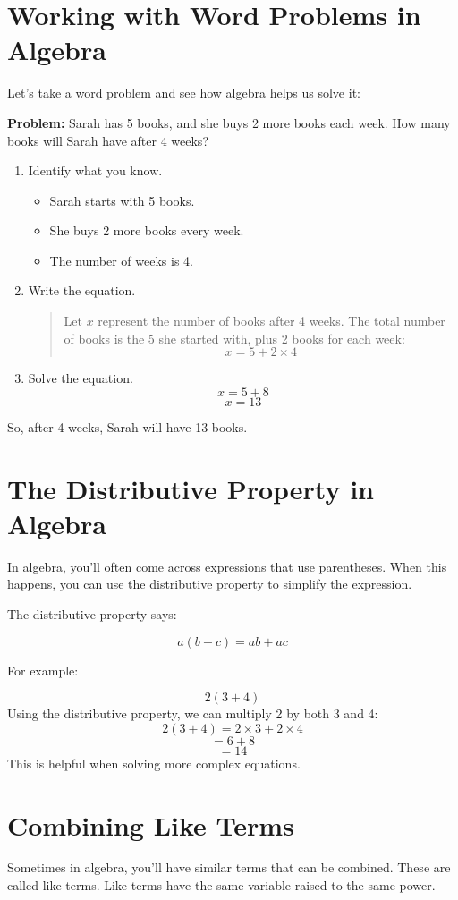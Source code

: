 \section{Working with Word Problems in Algebra}
Let’s take a word problem and see how algebra helps us solve it:

\textbf{Problem:} Sarah has 5 books, and she buys 2 more books each week. How many books will Sarah have after 4 weeks?

\begin{enumerate}
    \item Identify what you know.
    \begin{itemize}
        \item Sarah starts with 5 books.
        \item She buys 2 more books every week.
        \item The number of weeks is 4.
    \end{itemize}
    \item Write the equation.
    \begin{quote}
    Let $x$ represent the number of books after 4 weeks.
    The total number of books is the 5 she started with, plus 2 books for each week:
    \[ x = 5 + 2 \times 4 \]
    \end{quote}
    \item Solve the equation.
    \[ x = 5 + 8 \]
    \[ x = 13 \]
\end{enumerate}

So, after 4 weeks, Sarah will have 13 books.

\section{The Distributive Property in Algebra}
In algebra, you’ll often come across expressions that use parentheses. When this happens, you can use the distributive property to simplify the expression.

The distributive property says:

\[ a(b + c) = ab + ac \]

For example:

\[ 2(3 + 4) \]
Using the distributive property, we can multiply 2 by both 3 and 4:
\[ 2(3 + 4) = 2 \times 3 + 2 \times 4 \]
\[ = 6 + 8 \]
\[ = 14 \]
This is helpful when solving more complex equations.

\section{Combining Like Terms}
Sometimes in algebra, you'll have similar terms that can be combined. These are called like terms. Like terms have the same variable raised to the same power.

